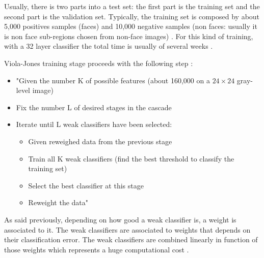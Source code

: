 \vspace{\baselineskip}
\noindent Usually, there is two parts into a test set: the first part is the training set and the second part is the validation set. 
Typically, the training set is composed by about 5,000 positives samples (faces) and 10,000 negative samples (non faces: usually it is non face sub-regions chosen from non-face images) \cite{DIN08}. For this kind of training, with a 32 layer classifier the total time is usually of several weeks \cite{VIO01}.
\newline

\noindent Viola-Jones training stage proceeds with the following step \cite{DIN08}:

\begin{itemize}
  \item "Given the number K of possible features (about 160,000 on a $ 24\times24 $ gray-level image)
  \item Fix the number L of desired stages in the cascade
  \item Iterate until L weak classifiers have been selected:
  \begin{itemize}
  	\item Given reweighed data from the previous stage
	\item Train all K weak classifiers (find the best threshold to classify the training set)
	\item Select the best classifier at this stage
	\item Reweight the data"
  \end{itemize}
\end{itemize}

\noindent As said previously, depending on how good a weak classifier is, a weight is associated to it. The weak classifiers are associated to weights that depends on their classification error. The weak classifiers are combined linearly in function of those weights which represents a huge computational cost \cite{DIN08}.
\newline





